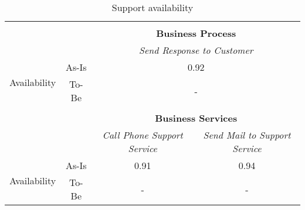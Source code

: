 \begin{table}[H]
\begin{tabular}{|c|c|p{2cm}|p{2.5cm}|p{2.5cm}|p{2.5cm}|}
		\multicolumn{6}{c}{} \\ \cline{3-6}
		\multicolumn{2}{c}{} & \multicolumn{4}{|c|}{\textbf{Business Process}} \\ \cline{3-6}
		\multicolumn{2}{c|}{} & \multicolumn{4}{|c|}{\textsl{Send Response to Customer}}\\ \hline
		\multirow{2}{*}{Availability} & As-Is & \multicolumn{4}{|c|}{0.92}\\ \cline{2-6}
									   & To-Be & \multicolumn{4}{|c|}{-}\\ \hline
		\multicolumn{6}{c}{} \\ \cline{3-6}
		\multicolumn{2}{c}{} & \multicolumn{4}{|c|}{\textbf{Business Services}} \\ \cline{3-6}
		\multicolumn{2}{c|}{} & \multicolumn{2}{|c|}{\textsl{Call Phone Support Service}} & \multicolumn{2}{|c|}{\textsl{Send Mail to Support Service}}\\ \hline
		\multirow{2}{*}{Availability} & As-Is & \multicolumn{2}{|c|}{0.91} & \multicolumn{2}{|c|}{0.94}\\ \cline{2-6}
									   & To-Be & \multicolumn{2}{|c|}{-} & \multicolumn{2}{|c|}{-}\\ \hline
	\end{tabular}
\caption{Support availability}
\label{tab:data_accuracy}
\end{table}